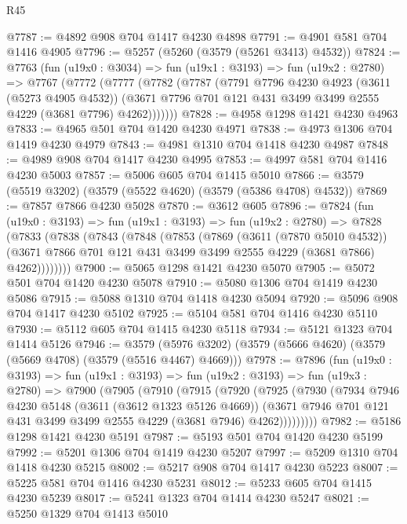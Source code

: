 \begin{lexlean}{R45}
\begin{coremodule}
@7787 := @4892 @908 @704 @1417 @4230 @4898
@7791 := @4901 @581 @704 @1416 @4905
@7796 := @5257 (@5260 (@3579 (@5261 @3413) @4532))
@7824 := @7763
    (fun (u19x0 : @3034) =>
    fun (u19x1 : @3193) =>
    fun (u19x2 : @2780) =>
    @7767
      (@7772
        (@7777
          (@7782
            (@7787
              (@7791
                @7796
                @4230
                @4923
                (@3611 (@5273 @4905 @4532))
                (@3671 @7796 @701 @121 @431 @3499 @3499 @2555 @4229 (@3681 @7796) @4262)))))))
@7828 := @4958 @1298 @1421 @4230 @4963
@7833 := @4965 @501 @704 @1420 @4230 @4971
@7838 := @4973 @1306 @704 @1419 @4230 @4979
@7843 := @4981 @1310 @704 @1418 @4230 @4987
@7848 := @4989 @908 @704 @1417 @4230 @4995
@7853 := @4997 @581 @704 @1416 @4230 @5003
@7857 := @5006 @605 @704 @1415 @5010
@7866 := @3579 (@5519 @3202) (@3579 (@5522 @4620) (@3579 (@5386 @4708) @4532))
@7869 := @7857 @7866 @4230 @5028
@7870 := @3612 @605
@7896 := @7824
    (fun (u19x0 : @3193) =>
    fun (u19x1 : @3193) =>
    fun (u19x2 : @2780) =>
    @7828
      (@7833
        (@7838
          (@7843
            (@7848
              (@7853
                (@7869
                  (@3611 (@7870 @5010 @4532))
                  (@3671 @7866 @701 @121 @431 @3499 @3499 @2555 @4229 (@3681 @7866) @4262))))))))
@7900 := @5065 @1298 @1421 @4230 @5070
@7905 := @5072 @501 @704 @1420 @4230 @5078
@7910 := @5080 @1306 @704 @1419 @4230 @5086
@7915 := @5088 @1310 @704 @1418 @4230 @5094
@7920 := @5096 @908 @704 @1417 @4230 @5102
@7925 := @5104 @581 @704 @1416 @4230 @5110
@7930 := @5112 @605 @704 @1415 @4230 @5118
@7934 := @5121 @1323 @704 @1414 @5126
@7946 := @3579 (@5976 @3202) (@3579 (@5666 @4620) (@3579 (@5669 @4708) (@3579 (@5516 @4467) @4669)))
@7978 := @7896
    (fun (u19x0 : @3193) =>
    fun (u19x1 : @3193) =>
    fun (u19x2 : @3193) =>
    fun (u19x3 : @2780) =>
    @7900
      (@7905
        (@7910
          (@7915
            (@7920
              (@7925
                (@7930
                  (@7934
                    @7946
                    @4230
                    @5148
                    (@3611 (@3612 @1323 @5126 @4669))
                    (@3671 @7946 @701 @121 @431 @3499 @3499 @2555 @4229 (@3681 @7946) @4262)))))))))
@7982 := @5186 @1298 @1421 @4230 @5191
@7987 := @5193 @501 @704 @1420 @4230 @5199
@7992 := @5201 @1306 @704 @1419 @4230 @5207
@7997 := @5209 @1310 @704 @1418 @4230 @5215
@8002 := @5217 @908 @704 @1417 @4230 @5223
@8007 := @5225 @581 @704 @1416 @4230 @5231
@8012 := @5233 @605 @704 @1415 @4230 @5239
@8017 := @5241 @1323 @704 @1414 @4230 @5247
@8021 := @5250 @1329 @704 @1413 @5010

\end{coremodule}
\end{lexlean}
